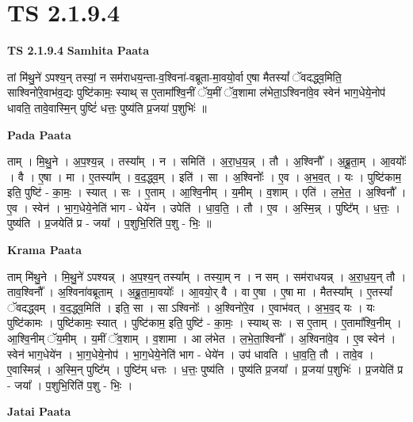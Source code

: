 \documentclass[17pt]{extarticle}
\begin{document}
\section{ TS 2.1.9.4 }

\textbf{TS 2.1.9.4 } \newline
\textbf{Samhita Paata} \newline

तां मि॑थु॒ने॑ ऽपश्य॒न् तस्यां॒ न सम॑राधय॒न्ता-व॒श्विना॑-वब्रूता-मा॒वयो॒र्वा ए॒षा मैतस्यां᳚ ॅवदद्ध्व॒मिति॒ साश्विनो॑रे॒वाभ॑व॒द्यः पुष्टि॑कामः॒ स्याथ् स ए॒तामा᳚श्वि॒नीं ॅय॒मीं ॅव॒शामा ल॑भेता॒ऽश्विना॑वे॒व स्वेन॑ भाग॒धेये॒नोप॑ धावति॒ तावे॒वास्मि॒न् पुष्टिं॑ धत्तः॒ पुष्य॑ति प्र॒जया॑ प॒शुभिः॑ ॥ \newline

\textbf{Pada Paata} \newline

ताम् । मि॒थु॒ने । अ॒प॒श्य॒न्न् । तस्या᳚म् । न । समिति॑ । अ॒रा॒ध॒य॒न्न् । तौ । अ॒श्विनौ᳚ । अ॒ब्रू॒ता॒म् । आ॒वयोः᳚ । वै । ए॒षा । मा । ए॒तस्या᳚म् । व॒द॒द्ध्व॒म् । इति॑ । सा । अ॒श्विनोः᳚ । ए॒व । अ॒भ॒व॒त् । यः । पुष्टि॑काम॒ इति॒ पुष्टि॑ - का॒मः॒ । स्यात् । सः । ए॒ताम् । आ॒श्वि॒नीम् । य॒मीम् । व॒शाम् । एति॑ । ल॒भे॒त॒ । अ॒श्विनौ᳚ । ए॒व । स्वेन॑ । भा॒ग॒धेये॒नेति॑ भाग - धेये॑न । उपेति॑ । धा॒व॒ति॒ । तौ । ए॒व । अ॒स्मि॒न्न् । पुष्टि᳚म् । ध॒त्तः॒ । पुष्य॑ति । प्र॒जयेति॑ प्र - जया᳚ । प॒शुभि॒रिति॑ प॒शु - भिः॒ ॥  \newline


\textbf{Krama Paata} \newline

ताम् मि॑थु॒ने । मि॒थु॒ने॑ ऽपश्यन्न् । अ॒प॒श्य॒न् तस्या᳚म् । तस्या॒म् न । न सम् । सम॑राधयन्न् । अ॒रा॒ध॒य॒न् तौ । ताव॒श्विनौ᳚ । अ॒श्विना॑वब्रूताम् । अ॒ब्रू॒ता॒मा॒वयोः᳚ । आ॒वयो॒र् वै । वा ए॒षा । ए॒षा मा । मैतस्या᳚म् । ए॒तस्यां᳚ ॅवदद्ध्वम् । व॒द॒द्ध्व॒मिति॑ । इति॒ सा । सा ऽश्विनोः᳚ । अ॒श्विनो॑रे॒व । ए॒वाभ॑वत् । अ॒भ॒व॒द् यः । यः पुष्टि॑कामः । पुष्टि॑कामः॒ स्यात् । पुष्टि॑काम॒ इति॒ पुष्टि॑ - का॒मः॒ । स्याथ् सः । स ए॒ताम् । ए॒तामा᳚श्वि॒नीम् । आ॒श्वि॒नीम् ॅय॒मीम् । य॒मीं ॅव॒शाम् । व॒शामा । आ ल॑भेत । ल॒भे॒ता॒श्विनौ᳚ । अ॒श्विना॑वे॒व । ए॒व स्वेन॑ । स्वेन॑ भाग॒धेये॑न । भा॒ग॒धेये॒नोप॑ । भा॒ग॒धेये॒नेति॑ भाग - धेये॑न । उप॑ धावति । धा॒व॒ति॒ तौ । तावे॒व । ए॒वास्मिन्न्॑ । अ॒स्मि॒न् पुष्टि᳚म् । पुष्टि॑म् धत्तः । ध॒त्तः॒ पुष्य॑ति । पुष्य॑ति प्र॒जया᳚ । प्र॒जया॑ प॒शुभिः॑ । प्र॒जयेति॑ प्र - जया᳚ । प॒शुभि॒रिति॑ प॒शु - भिः॒ । \newline

\textbf{Jatai Paata} \newline
\end{document}
